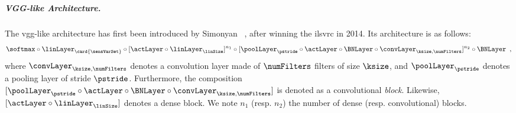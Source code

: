 \subparagraph{VGG-like Architecture.}
The \gls{vgg}-like architecture has first been introduced by Simonyan \etal{}~\cite{simonyan_vgg_2015}, after winning the \gls{ilsvrc} in 2014.
Its architecture is as follows:
\begin{equation}
	\softmax \circ \linLayer_{\card{\sensVarSet}} \circ [\actLayer \circ \linLayer_\linSize]^{n_1}
	\circ [\poolLayer_\pstride \circ \actLayer \circ \BNLayer \circ \convLayer_{\ksize, \numFilters}]^{n_2} \circ \BNLayer \enspace ,
	\label{eq:vgg_archi}
\end{equation}
where \(\convLayer_{\ksize, \numFilters}\) denotes a convolution layer made of \(\numFilters\) filters of size \(\ksize\), and \(\poolLayer_\pstride\) denotes a pooling layer of stride \(\pstride\).
Furthermore, the composition \([\poolLayer_\pstride \circ \actLayer \circ \BNLayer \circ \convLayer_{\ksize, \numFilters}]\) is denoted as a convolutional \emph{block}.
Likewise, \([\actLayer \circ \linLayer_\linSize]\) denotes a dense block.
We note \(n_1\) (resp. \(n_2\)) the number of dense (resp. convolutional) blocks.

